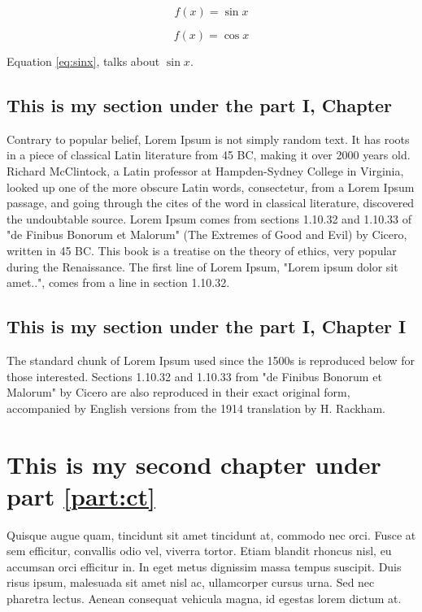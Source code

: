 \documentclass[oneside, a4paper]{book}
\begin{document}
\begin{equation}\label{eq:sinx}
f(x) = \sin x
\end{equation}

\begin{equation}
f(x) = \cos x
\end{equation}





Equation \ref{eq:sinx}, talks about $\sin x$.



\section{This is my section under the part I, Chapter }
Contrary to popular belief, Lorem Ipsum is not simply random text. It has roots in a piece of classical Latin literature from 45 BC, making it over 2000 years old. Richard McClintock, a Latin professor at Hampden-Sydney College in Virginia, looked up one of the more obscure Latin words, consectetur, from a Lorem Ipsum passage, and going through the cites of the word in classical literature, discovered the undoubtable source. Lorem Ipsum comes from sections 1.10.32 and 1.10.33 of "de Finibus Bonorum et Malorum" (The Extremes of Good and Evil) by Cicero, written in 45 BC. This book is a treatise on the theory of ethics, very popular during the Renaissance. The first line of Lorem Ipsum, "Lorem ipsum dolor sit amet..", comes from a line in section 1.10.32.
\section{This is my section under the part I, Chapter I }

The standard chunk of Lorem Ipsum used since the 1500s is reproduced below for those interested. Sections 1.10.32 and 1.10.33 from "de Finibus Bonorum et Malorum" by Cicero are also reproduced in their exact original form, accompanied by English versions from the 1914 translation by H. Rackham.
\chapter{This is my second chapter under part \ref{part:ct}}

 Quisque augue quam, tincidunt sit amet tincidunt at, commodo nec orci. Fusce at sem efficitur, convallis odio vel, viverra tortor. Etiam blandit rhoncus nisl, eu accumsan orci efficitur in. In eget metus dignissim massa tempus suscipit. Duis risus ipsum, malesuada sit amet nisl ac, ullamcorper cursus urna. Sed nec pharetra lectus. Aenean consequat vehicula magna, id egestas lorem dictum at.
\end{document}
